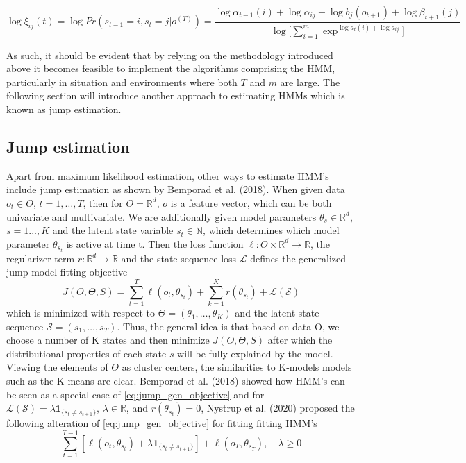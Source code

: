 \begin{equation}
    \log\xi_{ij}(t) = \log Pr(s_{t-1}=i, s_t=j|o^{(T)}) =  \frac{\log\alpha_{t-1}(i) + \log\alpha_{ij} + \log b_j(o_{t+1}) + \log \beta_{t+1}(j)}{\log\Big[\sum_{i=1}^m \exp^{\log a_t(i)+\log a_{ij}}\Big]}
    \label{eq: log xi}
\end{equation}

As such, it should be evident that by relying on the methodology introduced above it becomes feasible to implement the algorithms comprising the HMM, particularly in situation and environments where both $T$ and $m$ are large. The following section will introduce another approach to estimating HMMs which is known as jump estimation.


\subsection{Jump estimation}
\label{subsection: Jump theory}

Apart from maximum likelihood estimation, other ways to estimate HMM's include jump estimation as shown by Bemporad et al. (2018). When given data $o_t\in O$, $t=1,\ldots,T$, then for $O = \mathbb{R}^d$, $o$ is a feature vector, which can be both univariate and multivariate. We are additionally given model parameters $\theta_s\in \mathbb{R}^d$, $s=1...,K$ and the latent state variable $s_t\in\mathbb{N}$, which determines which model parameter $\theta_{s_t}$ is active at time t. Then the loss function $\ell: O\times\mathbb{R}^d \rightarrow\mathbb{R}$, the regularizer term $r: \mathbb{R}^d \rightarrow \mathbb{R}$ and the state sequence loss $\mathcal{L}$ defines the generalized jump model fitting objective
\begin{equation}
    J(O, \Theta, S) = \sum_{t=1}^T \ell(o_t,\theta_{s_t}) + \sum_{k=1}^K r(\theta_{s_t}) + \mathcal{L(S)}
\label{eq:jump_gen_objective}    
\end{equation}
which is minimized with respect to $\Theta=(\theta_1,\ldots,\theta_K)$ and the latent state sequence $\mathcal{S}=(s_1,\ldots,s_T)$. Thus, the general idea is that based on data O, we choose a number of K states and then minimize $J(O, \Theta, S)$ after which the distributional properties of each state $s$ will be fully explained by the model. Viewing the elements of $\Theta$ as cluster centers, the similarities to K-models models such as the K-means are clear. Bemporad et al. (2018) showed how HMM's can be seen as a special case of \cref{eq:jump_gen_objective} and for $\mathcal{L(S)} = \lambda\mathbf{1}_{\{ s_t\ne s_{t+1}\}}$, $\lambda \in \mathbb{R}$, and $r(\theta_{s_t})=0$, Nystrup et al. (2020) proposed the following alteration of \cref{eq:jump_gen_objective} for fitting fitting HMM's
\begin{equation}
    \sum_{t=1}^{T-1}[\ell(o_t, \theta_{s_t}) + \lambda\mathbf{1}_{\{ s_t\ne s_{t+1} \}}]
    + \ell(o_T, \theta_{s_T})
    ,\quad \lambda \geq 0
\label{eq:jump_objective}
\end{equation}

